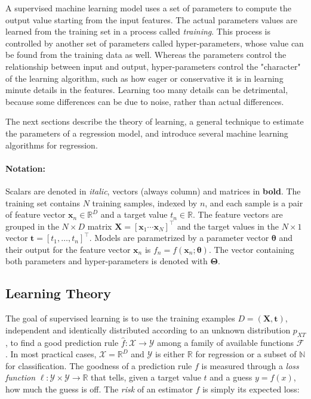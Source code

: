 \documentclass[12pt]{book}
\begin{document}
A supervised machine learning model uses a set of parameters to compute the output value starting from the input features. The actual parameters values are learned from the training set in a process called \emph{training}. This process is controlled by another set of parameters called hyper-parameters, whose value can be found from the training data as well. Whereas the parameters control the relationship between input and output, hyper-parameters control the "character" of the learning algorithm, such as how eager or conservative it is in learning minute details in the features. Learning too many details can be detrimental, because some differences can be due to noise, rather than actual differences.

The next sections describe the theory of learning, a general technique to estimate the parameters of a regression model, and introduce several machine learning algorithms for regression.

\paragraph{Notation:} Scalars are denoted in \textit{italic}, vectors (always column) and matrices in \textbf{bold}. The training set contains $N$ training samples, indexed by $n$, and each sample is a pair of feature vector $\bm x_n\in\mathbb{R}^D$ and a target value $t_n\in\mathbb{R}$. The feature vectors are grouped in the $N\times D$ matrix $\bm X=\left[\bm x_1\dotsb\bm x_N\right]^\intercal$ and the target values in the $N\times 1$ vector $\bm t=\left[t_1,\ldots,t_n\right]^\intercal$. Models are parametrized by a parameter vector $\bm\theta$ and their output for the feature vector $\bm x_n$ is $f_n=f(\bm x_n;\bm\theta)$. The vector containing both parameters and hyper-parameters is denoted with $\bm\Theta$.

\subsection{Learning Theory}
The goal of supervised learning is to use the training examples $D=(\bm X, \bm t)$, independent and identically distributed according to an unknown distribution $p_{XT}$, to find a good prediction rule $\hat{f}:\mathcal{X}\rightarrow\mathcal{Y}$ among a family of available functions $\mathcal{F}$. In most practical cases, $\mathcal{X}=\mathbb{R}^D$ and $\mathcal{Y}$ is either $\mathbb{R}$ for regression or a subset of $\mathbb{N}$ for classification. The goodness of a prediction rule $f$ is measured through a \emph{loss function} $\ell:\mathcal{Y}\times\mathcal{Y}\rightarrow\mathbb{R}$ that tells, given a target value $t$ and a guess $y=f(x)$, how much the guess is off. The \emph{risk} of an estimator $f$ is simply its expected loss:
\end{document}
